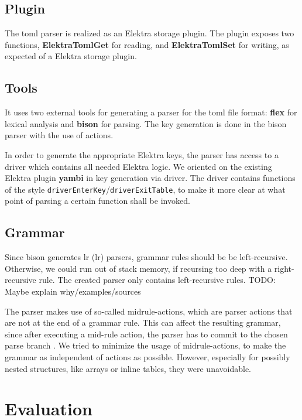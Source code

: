 \documentclass[12pt]{report}
\begin{document}
\section{Plugin}
The toml parser is realized as an Elektra storage plugin. The plugin exposes two functions, \textbf{ElektraTomlGet} for reading, and \textbf{ElektraTomlSet} for writing, as expected of a Elektra storage plugin.

\section{Tools}
It uses two external tools for generating a parser for the toml file format: \textbf{\acrshort{flex}} \cite{flexgit} for lexical analysis and \textbf{bison} \cite{bisonmain} for parsing.
The key generation is done in the bison parser with the use of actions.

In order to generate the appropriate Elektra keys, the parser has access to a driver which contains all needed Elektra logic.
We oriented on the existing Elektra plugin \textbf{yambi}\cite{Elektrayambi} in key generation via driver.
The driver contains functions of the style \texttt{driverEnterKey}/\texttt{driverExitTable}, to make it more clear at what point of parsing a certain function shall be invoked.

\section{Grammar}
Since bison generates \acrshort{lr} (\acrlong{lr}) parsers, grammar rules should be be left-recursive.
Otherwise, we could run out of stack memory, if recursing too deep with a right-recursive rule.
The created parser only contains left-recursive rules.
TODO: Maybe explain why/examples/sources

The parser makes use of so-called midrule-actions, which are parser actions that are not at the end of a grammar rule.
This can affect the resulting grammar, since after executing a mid-rule action, the parser has to commit to the chosen parse branch \cite{bisonmidruleconflicts}.
We tried to minimize the usage of midrule-actions, to make the grammar as independent of actions as possible.
However, especially for possibly nested structures, like arrays or inline tables, they were unavoidable.

\chapter{Evaluation}
\end{document}
